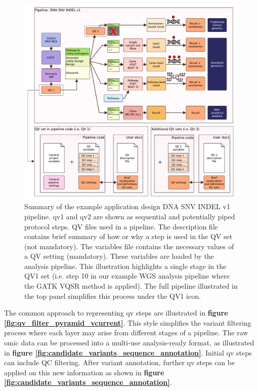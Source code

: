 \begin{figure}[h]
    \centering
   \includegraphics[width=0.99\textwidth]{./images/qv_pipeline_with_file_vcurrent.pdf}
    \caption{Summary of the example application design DNA SNV INDEL v1 pipeline. \ac{qv}1 and \ac{qv}2 are shown as sequential and potentially piped protocol steps.
    QV files used in a pipeline. The description file contains brief summary of how or why a step is used in the QV set (not mandatory). The variables file contains the necessary values of a QV setting (mandatory). These variables are loaded by the analysis pipeline. This illustration highlights a single stage in the QV1 set (i.e. step 10 in our example WGS analysis pipeline where the GATK VQSR method is applied). The full pipeline illustrated in the top panel simplifies this process under the QV1 icon.
    }
    \label{fig:qv_pipeline_with_file_vcurrent}
\end{figure}

The common approach to representing \ac{qv} steps are illustrated in 
\textbf{figure \ref{fig:qv_filter_pyramid_vcurrent}}.
This style simplifies the variant filtering process where each layer may arise from different stages of a pipeline.
The raw omic data can be processed into a multi-use analysis-ready format, as illustrated in 
\textbf{figure 
\ref{fig:candidate_variants_sequence_annotation}}.
Initial \ac{qv} steps can include QC filtering. 
After variant annotation, further \ac{qv} steps can be applied on this new information as shown in 
\textbf{figure
\ref{fig:candidate_variants_sequence_annotation}}.
 

